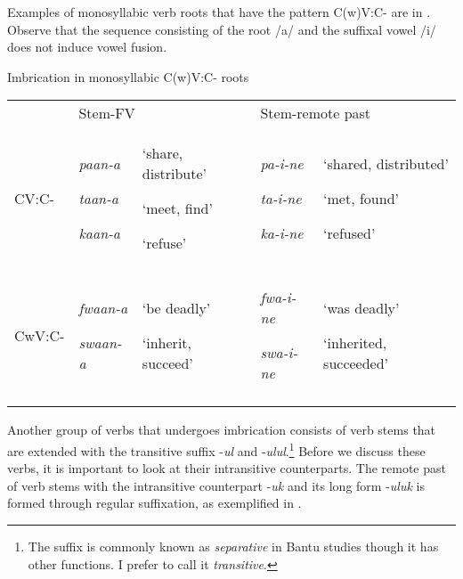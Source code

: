 \documentclass[output=paper]{langsci/langscibook}
\begin{document}
Examples of monosyllabic verb roots that have the pattern C(w)V:C- are in . Observe that the sequence consisting of the root /a/ and the suffixal vowel /i/ does not induce vowel fusion. 

\begin{table}
\caption{Imbrication in monosyllabic C(w)V:C- roots}
\label{tab:21}
\end{table}

\begin{tabular}{lllll} & \multicolumn{2}{l}{\mdseries Stem-FV} & \multicolumn{2}{l}{\mdseries Stem-remote past}\\
\lsptoprule
\mdseries CV:C- & {\mdseries \emph{paan-a}}

{\mdseries \emph{taan-a}}

\mdseries \emph{kaan-a} & {\mdseries ‘share, distribute’}

{\mdseries ‘meet, find’}

\mdseries ‘refuse’ & {\mdseries \emph{pa-i-ne}}

{\mdseries \emph{ta-i-ne}}

\mdseries \emph{ka-i-ne} & {\mdseries ‘shared, distributed’}

{\mdseries ‘met, found’}

\mdseries ‘refused’\\
\mdseries CwV:C- & {\mdseries \emph{fwaan-a}}

\mdseries \emph{swaan-a} & {\mdseries ‘be deadly’}

\mdseries ‘inherit, succeed’ & {\mdseries \emph{fwa-i-ne}}

\mdseries \emph{swa-i-ne} & {\mdseries ‘was deadly’}

\mdseries ‘inherited, succeeded’\\
\lspbottomrule
\end{tabular}
Another group of verbs that undergoes imbrication consists of verb stems that are extended with the transitive suffix -\textit{ul }and -\textit{ulul}.\footnote{ The suffix is commonly known as \emph{separative} in Bantu studies though it has other functions. I prefer to call it \emph{transitive}.} Before we discuss these verbs, it is important to look at their intransitive counterparts. The remote past of verb stems with the intransitive counterpart -\textit{uk} and its long form -\textit{uluk} is formed through regular suffixation, as exemplified in .
\end{document}
